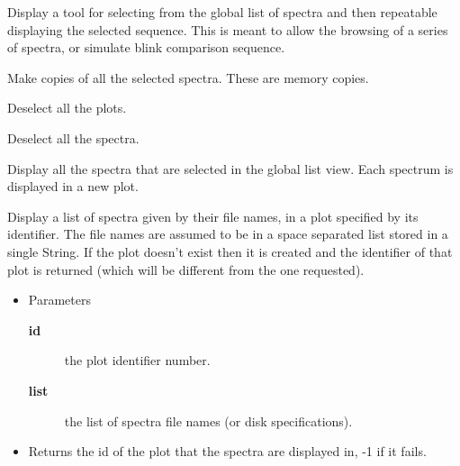 \begin{desc}Display a tool for selecting from the global list of spectra
 and then repeatable displaying the selected sequence. This is
 meant to allow the browsing of a series of spectra, or simulate
 blink comparison sequence.
\end{desc}

\begin{desc}Make copies of all the selected spectra. These are memory
 copies.
\end{desc}

\begin{desc}Deselect all the plots.
\end{desc}

\begin{desc}Deselect all the spectra.
\end{desc}

\begin{desc}Display all the spectra that are selected in the global list
 view. Each spectrum is displayed in a new plot.
\end{desc}

\begin{desc}Display a list of spectra given by their file names, in a plot
 specified by its identifier. The file names are assumed to be
 in a space separated list stored in a single String. If the
 plot doesn't exist then it is created and the identifier of
 that plot is returned (which will be different from the one
 requested).
\begin{itemize}
\item{Parameters
  \begin{description}
   \item[\textbf{id}]{the plot identifier number.}
   \item[\textbf{list}]{the list of spectra file names (or disk
             specifications).}
  \end{description}}
\end{itemize}
\begin{itemize}
\item{Returns the id of the plot that the spectra are displayed
         in, -1 if it fails. }
\end{itemize}
\end{desc}

